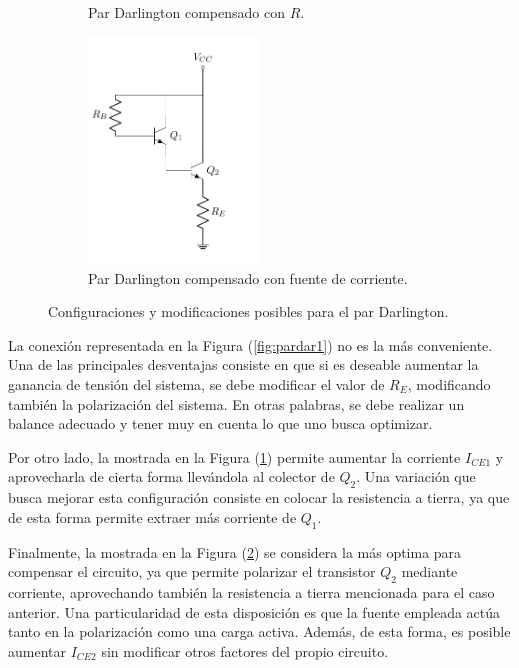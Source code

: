 \begin{figure}[H]
\begin{subfigure}{.4\textwidth}
	\caption{Par Darlington compensado con $R$.}
	\label{fig:pardar2}
\end{subfigure}
\begin{subfigure}{.5\textwidth}
\centering
	\includegraphics[width=0.5\textwidth, page=3]{Imagenes/ParDarlington.pdf}
	\caption{Par Darlington compensado con fuente de corriente.}
	\label{fig:pardar3}
\end{subfigure}
\caption{Configuraciones y modificaciones posibles para el par Darlington.}
\label{fig:pardar}
\end{figure}

La conexión representada en la Figura (\ref{fig:pardar1}) no es la más conveniente. Una de las principales desventajas consiste en que si es deseable aumentar la ganancia de tensión del sistema, se debe modificar el valor de $R_E$, modificando también la polarización del sistema. En otras palabras, se debe realizar un balance adecuado y tener muy en cuenta lo que uno busca optimizar.

Por otro lado, la mostrada en la Figura (\ref{fig:pardar2}) permite aumentar la corriente $I_{CE1}$ y aprovecharla de cierta forma llevándola al colector de $Q_2$. Una variación que busca mejorar esta configuración consiste en colocar la resistencia a tierra, ya que de esta forma permite extraer más corriente de $Q_1$.

Finalmente, la mostrada en la Figura (\ref{fig:pardar3}) se considera la más optima para compensar el circuito, ya que permite polarizar el transistor $Q_2$ mediante corriente, aprovechando también la resistencia a tierra mencionada para el caso anterior. Una particularidad de esta disposición es que la fuente empleada actúa tanto en la polarización como una carga activa. Además, de esta forma, es posible aumentar $I_{CE2}$ sin modificar otros factores del propio circuito.

